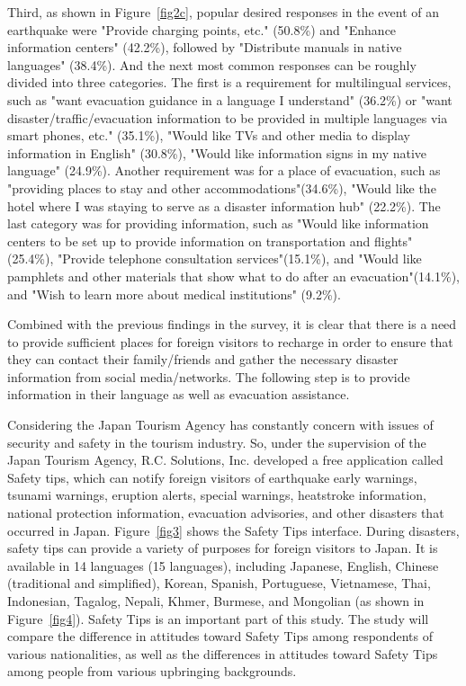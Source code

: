 Third, as shown in Figure~\ref{fig2c}, popular desired responses in the event of an earthquake were "Provide charging points, etc." (50.8\%) and "Enhance information centers" (42.2\%), followed by "Distribute manuals in native languages" (38.4\%). And the next most common responses can be roughly divided into three categories. The first is a requirement for multilingual services, such as "want evacuation guidance in a language I understand" (36.2\%) or "want disaster/traffic/evacuation information to be provided in multiple languages via smart phones, etc." (35.1\%), "Would like TVs and other media to display information in English" (30.8\%), "Would like information signs in my native language" (24.9\%). Another requirement was for a place of evacuation, such as "providing places to stay and other accommodations"(34.6\%), "Would like the hotel where I was staying to serve as a disaster information hub" (22.2\%). The last category was for providing information, such as "Would like information centers to be set up to provide information on transportation and flights" (25.4\%), "Provide telephone consultation services"(15.1\%), and "Would like pamphlets and other materials that show what to do after an evacuation"(14.1\%), and "Wish to learn more about medical institutions" (9.2\%).

Combined with the previous findings in the survey, it is clear that there is a need to provide sufficient places for foreign visitors to recharge in order to ensure that they can contact their family/friends and gather the necessary disaster information from social media/networks. The following step is to provide information in their language as well as evacuation assistance.

Considering the Japan Tourism Agency has constantly concern with issues of security and safety in the tourism industry. So, under the supervision of the Japan Tourism Agency, R.C. Solutions, Inc. developed a free application called Safety tips, which can notify foreign visitors of earthquake early warnings, tsunami warnings, eruption alerts, special warnings, heatstroke information, national protection information, evacuation advisories, and other disasters that occurred in Japan. Figure~\ref{fig3} shows the Safety Tips interface. During disasters, safety tips can provide a variety of purposes for foreign visitors to Japan. It is available in 14 languages (15 languages), including Japanese, English, Chinese (traditional and simplified), Korean, Spanish, Portuguese, Vietnamese, Thai, Indonesian, Tagalog, Nepali, Khmer, Burmese, and Mongolian (as shown in Figure~\ref{fig4}). Safety Tips is an important part of this study. The study will compare the difference in attitudes toward Safety Tips among respondents of various nationalities, as well as the differences in attitudes toward Safety Tips among people from various upbringing backgrounds.



